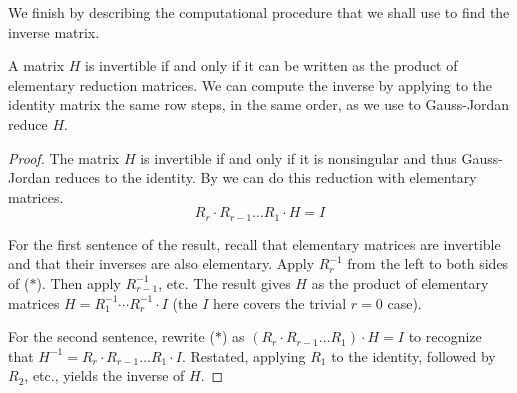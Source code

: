 We finish by describing the computational procedure
that we shall use to find the inverse matrix.

\begin{lemma} \label{lem:ComputeInvMat}
A matrix $H$ is invertible if and only if it can be written as the product of
elementary reduction matrices.
We can compute the inverse by applying to the 
identity matrix the same row steps, in the same order, as we use to
Gauss-Jordan reduce $H$. 
\end{lemma}

\begin{proof}
The matrix $H$ is invertible if and only if it is nonsingular and thus 
Gauss-Jordan reduces to the identity.
By  we can do this reduction 
with elementary matrices.
\begin{equation*} 
   R_r\cdot R_{r-1}\dots R_1\cdot H=I 
   \tag{*}
\end{equation*}

For the first sentence of the result, recall that
elementary matrices are invertible and that their inverses are also
elementary.
Apply $R_r^{-1}$ from the left to both sides of ($*$). 
Then apply
$R_{r-1}^{-1}$, etc.
The result gives $H$ as the product of
elementary matrices $H=R_1^{-1}\cdots R_r^{-1}\cdot I$
(the $I$ here covers the trivial $r=0$ case).

For the second sentence,
rewrite ($*$) as $(R_r\cdot R_{r-1}\dots R_1)\cdot H=I$
to recognize that 
$H^{-1}=R_r\cdot R_{r-1}\dots R_1\cdot I$.
Restated, applying $R_1$ to the identity, 
followed by $R_2$, etc., yields the inverse of $H$.
\end{proof}

